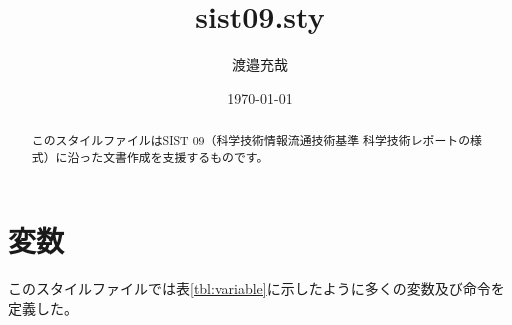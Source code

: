 ﻿\documentclass[uplatex]{jsarticle}
\author{渡邉充哉}
\date{\today}
\title{sist09.sty}
\begin{document}
\maketitle

\begin{abstract}
このスタイルファイルはSIST 09（科学技術情報流通技術基準 科学技術レポートの様式）に沿った文書作成を支援するものです。
\end{abstract}

\tableofcontents%
\thispagestyle{empty}%
\setcounter{page}{1}

\section{変数}
このスタイルファイルでは表\ref{tbl:variable}に示したように多くの変数及び命令を定義した。
\end{document}
